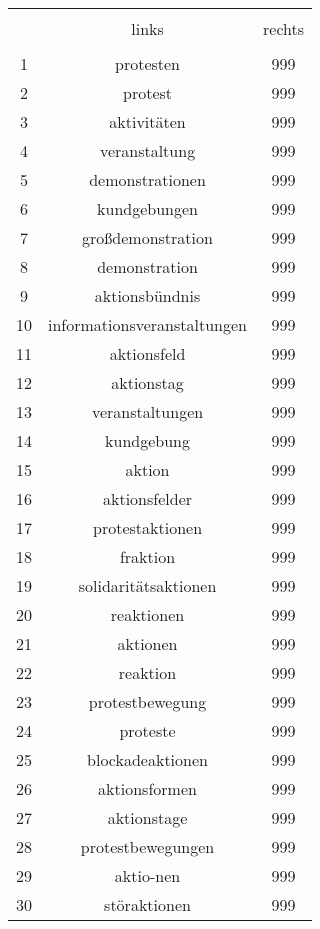 
\begin{table}[!htbp] \centering 
  \caption{} 
  \label{} 
\begin{tabular}{@{\extracolsep{5pt}} ccc} 
\\[-1.8ex]\hline 
\hline \\[-1.8ex] 
 & links & rechts \\ 
\hline \\[-1.8ex] 
1 & protesten & 999 \\ 
2 & protest & 999 \\ 
3 & aktivitäten & 999 \\ 
4 & veranstaltung & 999 \\ 
5 & demonstrationen & 999 \\ 
6 & kundgebungen & 999 \\ 
7 & großdemonstration & 999 \\ 
8 & demonstration & 999 \\ 
9 & aktionsbündnis & 999 \\ 
10 & informationsveranstaltungen & 999 \\ 
11 & aktionsfeld & 999 \\ 
12 & aktionstag & 999 \\ 
13 & veranstaltungen & 999 \\ 
14 & kundgebung & 999 \\ 
15 & aktion & 999 \\ 
16 & aktionsfelder & 999 \\ 
17 & protestaktionen & 999 \\ 
18 & fraktion & 999 \\ 
19 & solidaritätsaktionen & 999 \\ 
20 & reaktionen & 999 \\ 
21 & aktionen & 999 \\ 
22 & reaktion & 999 \\ 
23 & protestbewegung & 999 \\ 
24 & proteste & 999 \\ 
25 & blockadeaktionen & 999 \\ 
26 & aktionsformen & 999 \\ 
27 & aktionstage & 999 \\ 
28 & protestbewegungen & 999 \\ 
29 & aktio-nen & 999 \\ 
30 & störaktionen & 999 \\ 

\end{tabular}
\end{table}
